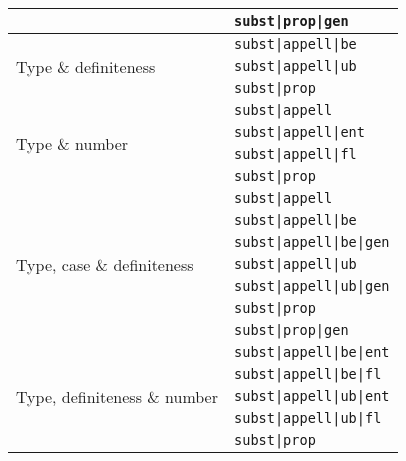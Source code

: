 \documentclass[a4paper,12pt,english]{book}
\begin{document}
\begin{appendices}
\begin{table}
\begin{tabular}{@{}ll@{}}
            & \texttt{subst|prop|gen} \\
            \midrule
            \multirow{3}{*}{Type \& definiteness}
            & \texttt{subst|appell|be} \\
            & \texttt{subst|appell|ub} \\
            & \texttt{subst|prop} \\
            \midrule
            \multirow{4}{*}{Type \& number}
            & \texttt{subst|appell} \\
            & \texttt{subst|appell|ent} \\
            & \texttt{subst|appell|fl} \\
            & \texttt{subst|prop} \\
            \midrule
            \multirow{7}{*}{Type, case \& definiteness}
            & \texttt{subst|appell} \\
            & \texttt{subst|appell|be} \\
            & \texttt{subst|appell|be|gen} \\
            & \texttt{subst|appell|ub} \\
            & \texttt{subst|appell|ub|gen} \\
            & \texttt{subst|prop} \\
            & \texttt{subst|prop|gen} \\
            \midrule
            \multirow{5}{*}{Type, definiteness \& number}
            & \texttt{subst|appell|be|ent} \\
            & \texttt{subst|appell|be|fl} \\
            & \texttt{subst|appell|ub|ent} \\
            & \texttt{subst|appell|ub|fl} \\
            & \texttt{subst|prop} \\

\end{tabular}
\end{table}
\end{appendices}
\end{document}
